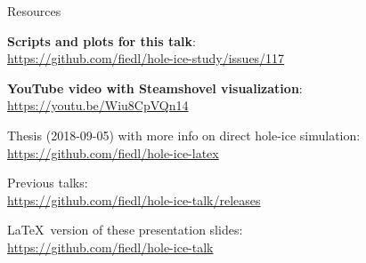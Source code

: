 
\begin{frame}{Resources}
  \begin{center}
    \textbf{Scripts and plots for this talk}: \\ \vspace{0.2cm}
    \url{https://github.com/fiedl/hole-ice-study/issues/117}

    \vspace{1cm}

    \textbf{YouTube video with Steamshovel visualization}: \\ \vspace{0.2cm}
    \url{https://youtu.be/Wiu8CpVQn14}

    \vspace{1cm}

    Thesis (2018-09-05) with more info on direct hole-ice simulation: \\ \vspace{0.2cm}
    \url{https://github.com/fiedl/hole-ice-latex}

    \vspace{1cm}

    Previous talks: \\ \vspace{0.2cm}
    \url{https://github.com/fiedl/hole-ice-talk/releases}

    \vspace{1cm}

    \LaTeX\ version of these presentation slides: \\ \vspace{0.2cm}
    \url{https://github.com/fiedl/hole-ice-talk}
  \end{center}
\end{frame}

